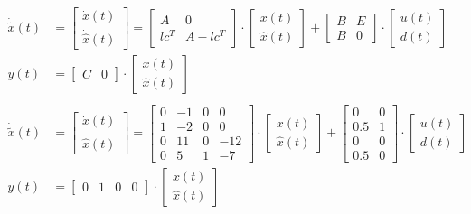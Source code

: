 \documentclass[11pt]{scrartcl} %
\begin{document}
\begin{align*}
	\dot{\tilde{x}}(t)&=\begin{bmatrix}\dot{x}(t)\\\dot{\hat{x}}(t)\end{bmatrix}=\begin{bmatrix}A&0\\lc^T&A-lc^T\end{bmatrix}\cdot\begin{bmatrix}x(t)\\\hat{x}(t)\end{bmatrix}+\begin{bmatrix}B&E\\B&0\end{bmatrix}\cdot \begin{bmatrix}u(t)\\d(t)\end{bmatrix}\\
	y(t)&=\begin{bmatrix}C&0\end{bmatrix}\cdot\begin{bmatrix}x(t)\\\hat{x}(t)\end{bmatrix}\\\\
	\dot{\tilde{x}}(t)&=\begin{bmatrix}\dot{x}(t)\\\dot{\hat{x}}(t)\end{bmatrix}=\begin{bmatrix}0&-1&0&0\\1&-2&0&0\\0&11&0&-12\\0&5&1&-7\end{bmatrix}\cdot\begin{bmatrix}x(t)\\\hat{x}(t)\end{bmatrix}+\begin{bmatrix}0&0\\0.5&1\\0&0\\0.5&0\end{bmatrix}\cdot \begin{bmatrix}u(t)\\d(t)\end{bmatrix}\\
	y(t)&=\begin{bmatrix}0&1&0&0\end{bmatrix}\cdot\begin{bmatrix}x(t)\\\hat{x}(t)\end{bmatrix}
\end{align*}
\end{document}
